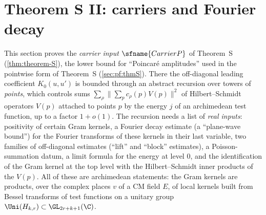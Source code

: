 \section{Theorem S II: carriers and Fourier decay}\label{sec:pf:thmS-carrier}

\providecommand{\thmScarrierPt}{\mathrm{Pt}}
\providecommand{\thmScarrierNst}{N^{\mathrm{st}}}
\providecommand{\thmScarrierNz}{N^{0}}
\providecommand{\thmScarrierNhat}{\widehat{N}}
\providecommand{\thmScarrierMaj}{\operatorname{maj}}
\providecommand{\thmScarrierWt}{\operatorname{wt}}
\providecommand{\thmScarrierCnt}{\operatorname{cnt}}
\providecommand{\thmScarrierNtop}{N_{\mathrm{top}}}
\providecommand{\thmScarrierWb}{\mathcal{W}}
\providecommand{\thmScarrierEn}{\mathcal{E}}
\providecommand{\thmScarrierld}{\operatorname{ld}}
\providecommand{\thmScarrierDat}{\mathfrak{D}}

This section proves the \emph{carrier input} $\sfname{CarrierP}$ of Theorem~S (\cref{thm:theorem-S}), the lower bound for
``Poincar\'e amplitudes'' used in the pointwise form of Theorem~S (\cref{sec:pf:thmS}). There the off-diagonal leading
coefficient $K_0(u,u')$ is bounded through an abstract recursion over towers of \emph{points}, which controls sums
$\sum_\rho\|\sum_pc_\rho(p)V(p)\|^2$ of Hilbert--Schmidt operators $V(p)$ attached to points $p$ by the energy $j$ of an
archimedean test function, up to a factor $1+o(1)$. The recursion needs a list of \emph{real inputs}: positivity of certain
Gram kernels, a Fourier decay estimate (a ``plane-wave bound'') for the Fourier transforms of these kernels in their last
variable, two families of off-diagonal estimates (``lift'' and ``block'' estimates), a Poisson-summation datum, a limit
formula for the energy at level $0$, and the identification of the Gram kernel at the top level with the Hilbert--Schmidt
inner products of the $V(p)$. All of these are archimedean statements: the Gram kernels are products, over the complex
places $v$ of a CM field $E$, of local kernels built from Bessel transforms of test functions on a unitary group
$\Uni(H_{k,r})\subset\GL_{2r+k+1}(\C)$.

